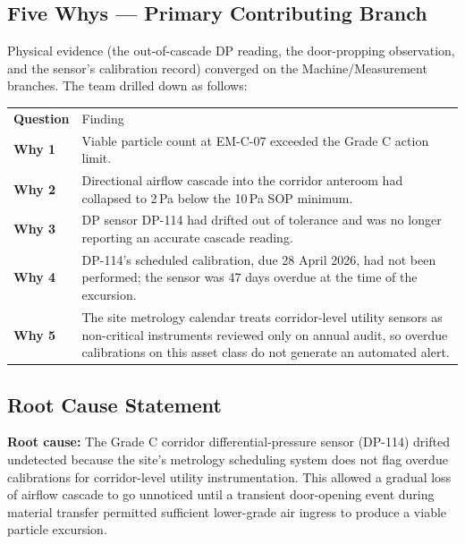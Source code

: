 \subsection{Five Whys --- Primary Contributing Branch}

Physical evidence (the out-of-cascade DP reading, the door-propping observation, and the
sensor's calibration record) converged on the Machine/Measurement branches. The team
drilled down as follows:

\begin{center}
\begin{tabularx}{\linewidth}{@{}>{\bfseries}p{2.4cm} X@{}}
\rowcolor{meridiannavy}
{\color{white}Question} & {\color{white}Finding} \\
Why 1 & Viable particle count at EM-C-07 exceeded the Grade C action limit. \\
Why 2 & Directional airflow cascade into the corridor anteroom had collapsed to
2\,Pa below the 10\,Pa SOP minimum. \\
Why 3 & DP sensor DP-114 had drifted out of tolerance and was no longer reporting
an accurate cascade reading. \\
Why 4 & DP-114's scheduled calibration, due 28 April 2026, had not been performed;
the sensor was 47 days overdue at the time of the excursion. \\
Why 5 & The site metrology calendar treats corridor-level utility sensors as
non-critical instruments reviewed only on annual audit, so overdue calibrations on
this asset class do not generate an automated alert. \\
\end{tabularx}
\end{center}

\subsection{Root Cause Statement}

\begin{tcolorbox}[infobox]
\textbf{Root cause:} The Grade C corridor differential-pressure sensor (DP-114) drifted
undetected because the site's metrology scheduling system does not flag overdue
calibrations for corridor-level utility instrumentation. This allowed a gradual loss of
airflow cascade to go unnoticed until a transient door-opening event during material
transfer permitted sufficient lower-grade air ingress to produce a viable particle
excursion.
\end{tcolorbox}
